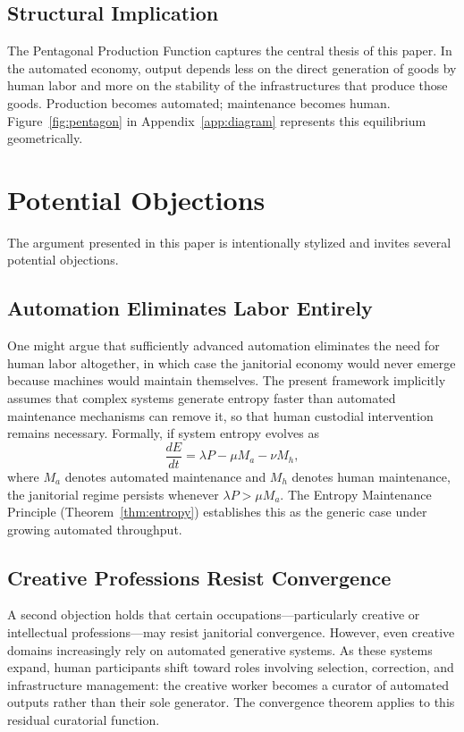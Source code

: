 \documentclass[12pt,a4paper]{article}
\theoremstyle{plain}
\theoremstyle{definition}
\theoremstyle{remark}
\begin{document}
\subsection{Structural Implication}

The Pentagonal Production Function captures the central thesis of this paper.
In the automated economy, output depends less on the direct generation of
goods by human labor and more on the stability of the infrastructures that
produce those goods.  Production becomes automated; maintenance becomes human.
Figure~\ref{fig:pentagon} in Appendix~\ref{app:diagram} represents this
equilibrium geometrically.

\section{Potential Objections}
\label{sec:objections}

The argument presented in this paper is intentionally stylized and invites
several potential objections.

\subsection{Automation Eliminates Labor Entirely}

One might argue that sufficiently advanced automation eliminates the need for
human labor altogether, in which case the janitorial economy would never
emerge because machines would maintain themselves.  The present framework
implicitly assumes that complex systems generate entropy faster than automated
maintenance mechanisms can remove it, so that human custodial intervention
remains necessary.  Formally, if system entropy evolves as
\[
\frac{dE}{dt} = \lambda P - \mu M_a - \nu M_h,
\]
where $M_a$ denotes automated maintenance and $M_h$ denotes human maintenance,
the janitorial regime persists whenever $\lambda P > \mu M_a$.  The
Entropy Maintenance Principle (Theorem~\ref{thm:entropy}) establishes this as
the generic case under growing automated throughput.

\subsection{Creative Professions Resist Convergence}

A second objection holds that certain occupations---particularly creative or
intellectual professions---may resist janitorial convergence.  However, even
creative domains increasingly rely on automated generative systems.  As these
systems expand, human participants shift toward roles involving selection,
correction, and infrastructure management: the creative worker becomes a
curator of automated outputs rather than their sole generator.  The
convergence theorem applies to this residual curatorial function.
\end{document}
